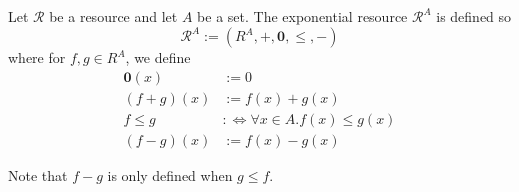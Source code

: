 \documentclass[10pt]{article}
\begin{document}
\begin{definition}
    Let $\mathcal{R}$ be a resource and let $A$ be a set.
    The exponential resource $\mathcal{R}^A$  is defined so
    \[
        \mathcal{R}^A := (R^A, +, \bm{0}, \leq, -)
    \]
    where for $f,g \in R^A$, we define
    \begin{align*}
        \bm{0}(x) &:= 0 \\
        (f + g)(x) &:= f(x) + g(x) \\
        f \leq g &:\Leftrightarrow \forall x \in A. f(x) \leq g(x) \\
        (f - g)(x) &:= f(x) - g(x)
    \end{align*}

    Note that $f - g$ is only defined when $g \leq f$.
\end{definition}
\end{document}
